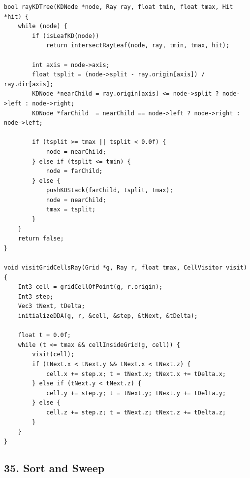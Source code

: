 \documentclass[10pt,letterpaper]{article}
\begin{document}
\begin{verbatim}
bool rayKDTree(KDNode *node, Ray ray, float tmin, float tmax, Hit *hit) {
    while (node) {
        if (isLeafKD(node))
            return intersectRayLeaf(node, ray, tmin, tmax, hit);

        int axis = node->axis;
        float tsplit = (node->split - ray.origin[axis]) / ray.dir[axis];
        KDNode *nearChild = ray.origin[axis] <= node->split ? node->left : node->right;
        KDNode *farChild  = nearChild == node->left ? node->right : node->left;

        if (tsplit >= tmax || tsplit < 0.0f) {
            node = nearChild;
        } else if (tsplit <= tmin) {
            node = farChild;
        } else {
            pushKDStack(farChild, tsplit, tmax);
            node = nearChild;
            tmax = tsplit;
        }
    }
    return false;
}

void visitGridCellsRay(Grid *g, Ray r, float tmax, CellVisitor visit) {
    Int3 cell = gridCellOfPoint(g, r.origin);
    Int3 step;
    Vec3 tNext, tDelta;
    initializeDDA(g, r, &cell, &step, &tNext, &tDelta);

    float t = 0.0f;
    while (t <= tmax && cellInsideGrid(g, cell)) {
        visit(cell);
        if (tNext.x < tNext.y && tNext.x < tNext.z) {
            cell.x += step.x; t = tNext.x; tNext.x += tDelta.x;
        } else if (tNext.y < tNext.z) {
            cell.y += step.y; t = tNext.y; tNext.y += tDelta.y;
        } else {
            cell.z += step.z; t = tNext.z; tNext.z += tDelta.z;
        }
    }
}
\end{verbatim}


\subsection*{35. Sort and Sweep}
\end{document}
